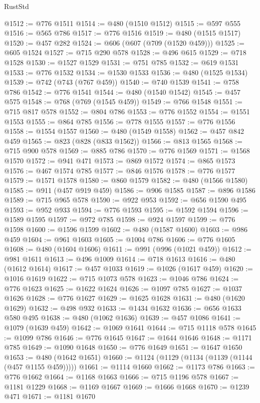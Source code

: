 \begin{lexlean}{RustStd}
\begin{coremodule}
{\begin{coremodule}
{{{{{{{{{{{{{{{{{{{{{{{{{{{{{{{{{@1512 := @776 @1511
@1514 := @480 (@1510 @1512)
@1515 := @597 @555
@1516 := @565 @786
@1517 := @776 @1516
@1519 := @480 (@1515 @1517)
@1520 := @457 @282
@1524 := @606 (@607 (@709 (@1520 @459)))
@1525 := @605 @1524
@1527 := @715 @290 @578
@1528 := @496 @615
@1529 := @718 @1528
@1530 := @1527 @1529
@1531 := @751 @785
@1532 := @619 @1531
@1533 := @776 @1532
@1534 := @1530 @1533
@1536 := @480 (@1525 @1534)
@1539 := @742 (@743 (@767 @459))
@1540 := @740 @1539
@1541 := @758 @786
@1542 := @776 @1541
@1544 := @480 (@1540 @1542)
@1545 := @457 @575
@1548 := @768 (@769 (@1545 @459))
@1549 := @766 @1548
@1551 := @715 @817 @578
@1552 := @804 @786
@1553 := @776 @1552
@1554 := @1551 @1553
@1555 := @864 @785
@1556 := @778 @1555
@1557 := @776 @1556
@1558 := @1554 @1557
@1560 := @480 (@1549 @1558)
@1562 := @457 @842 @459
@1565 := @823 (@828 (@833 @1562))
@1566 := @813 @1565
@1568 := @715 @900 @578
@1569 := @885 @786
@1570 := @776 @1569
@1571 := @1568 @1570
@1572 := @941 @471
@1573 := @869 @1572
@1574 := @865 @1573
@1576 := @467 @1574 @785
@1577 := @846 @1576
@1578 := @776 @1577
@1579 := @1571 @1578
@1580 := @860 @1579
@1582 := @480 (@1566 @1580)
@1585 := @911 (@457 @919 @459)
@1586 := @906 @1585
@1587 := @896 @1586
@1589 := @715 @965 @578
@1590 := @922 @953
@1592 := @656 @1590 @495
@1593 := @952 @933
@1594 := @776 @1593
@1595 := @1592 @1594
@1596 := @1589 @1595
@1597 := @972 @785
@1598 := @924 @1597
@1599 := @776 @1598
@1600 := @1596 @1599
@1602 := @480 (@1587 @1600)
@1603 := @986 @459
@1604 := @961 @1603
@1605 := @1004 @786
@1606 := @776 @1605
@1608 := @480 (@1604 @1606)
@1611 := @991 (@996 (@1021 @459))
@1612 := @981 @1611
@1613 := @496 @1009
@1614 := @718 @1613
@1616 := @480 (@1612 @1614)
@1617 := @457 @1033
@1619 := @1026 (@1617 @459)
@1620 := @1016 @1619
@1622 := @715 @1073 @578
@1623 := @1046 @786
@1624 := @776 @1623
@1625 := @1622 @1624
@1626 := @1097 @785
@1627 := @1037 @1626
@1628 := @776 @1627
@1629 := @1625 @1628
@1631 := @480 (@1620 @1629)
@1632 := @498 @932
@1633 := @1434 @1632
@1636 := @656 @1633 @580 @495
@1638 := @480 (@1062 @1636)
@1639 := @457 @1086
@1641 := @1079 (@1639 @459)
@1642 := @1069 @1641
@1644 := @715 @1118 @578
@1645 := @1099 @786
@1646 := @776 @1645
@1647 := @1644 @1646
@1648 := @1171 @785
@1649 := @1090 @1648
@1650 := @776 @1649
@1651 := @1647 @1650
@1653 := @480 (@1642 @1651)
@1660 := @1124 (@1129 (@1134 (@1139 (@1144 (@457 @1155 @459)))))
@1661 := @1114 @1660
@1662 := @1173 @786
@1663 := @776 @1662
@1664 := @1168 @1663
@1666 := @715 @1196 @578
@1667 := @1181 @1229
@1668 := @1169 @1667
@1669 := @1666 @1668
@1670 := @1239 @471
@1671 := @1181 @1670
}}}}}}}}}}}}}}}}}}}}}}}}}}}}}}}}}
\end{coremodule}}
\end{coremodule}
\end{lexlean}
